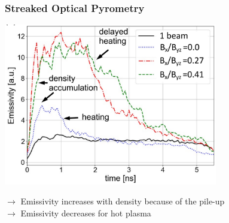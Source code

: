 \documentclass{beamer}
\begin{document}
\begin{frame}
\frametitle{Streaked Optical Pyrometry}

\begin{center}
\includegraphics[width=0.7\textwidth]{SOP.png}
\end{center}

$\rightarrow$ Emissivity increases with density because of the pile-up\\
$\rightarrow$ Emissivity decreases for hot plasma

\end{frame}
\end{document}
